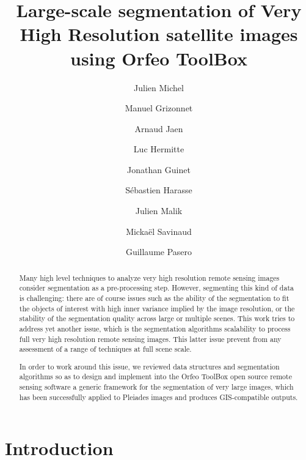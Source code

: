 \documentclass{josis}
\begin{document}
\title{Large-scale segmentation of Very High Resolution satellite images using Orfeo ToolBox}

\author{Julien Michel}
\author{Manuel Grizonnet}
\author{Arnaud Jaen}
\author{Luc Hermitte}
\author{Jonathan Guinet}
\author{S\'ebastien Harasse}
\author{Julien Malik}
\author{Micka\"el Savinaud}
\author{Guillaume Pasero}


\maketitle


\begin{abstract}
Many high level techniques to analyze very high resolution remote
sensing images consider segmentation as a pre-processing
step. However, segmenting this kind of data is challenging: there are
of course issues such as the ability of the segmentation to fit the
objects of interest with high inner variance implied by the image
resolution, or the stability of the segmentation quality across large
or multiple scenes. This work tries to address yet another issue,
which is the segmentation algorithms scalability to process full very
high resolution remote sensing images. This latter issue prevent from
any assessment of a range of techniques at full scene scale.

In order to work around this issue, we reviewed data structures and
segmentation algorithms so as to design and implement into the Orfeo
ToolBox open source remote sensing software a generic framework for
the segmentation of very large images, which has been successfully
applied to Pleiades images and produces GIS-compatible outputs.

\end{abstract}


\section{Introduction}
\end{document}

